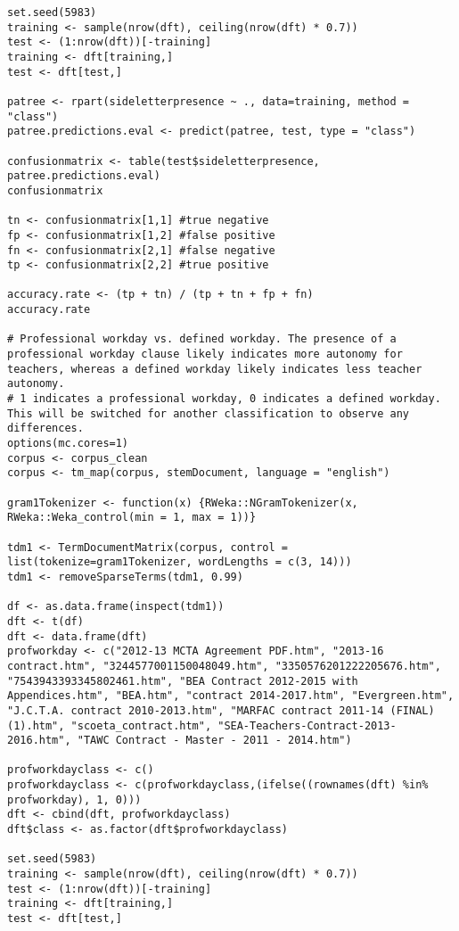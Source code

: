 \begin{lstlisting}
set.seed(5983)
training <- sample(nrow(dft), ceiling(nrow(dft) * 0.7))
test <- (1:nrow(dft))[-training]
training <- dft[training,]
test <- dft[test,]

patree <- rpart(sideletterpresence ~ ., data=training, method = "class")
patree.predictions.eval <- predict(patree, test, type = "class")

confusionmatrix <- table(test$sideletterpresence, patree.predictions.eval)
confusionmatrix

tn <- confusionmatrix[1,1] #true negative
fp <- confusionmatrix[1,2] #false positive
fn <- confusionmatrix[2,1] #false negative
tp <- confusionmatrix[2,2] #true positive

accuracy.rate <- (tp + tn) / (tp + tn + fp + fn)
accuracy.rate

# Professional workday vs. defined workday. The presence of a professional workday clause likely indicates more autonomy for teachers, whereas a defined workday likely indicates less teacher autonomy. 
# 1 indicates a professional workday, 0 indicates a defined workday. This will be switched for another classification to observe any differences.
options(mc.cores=1)
corpus <- corpus_clean
corpus <- tm_map(corpus, stemDocument, language = "english")

gram1Tokenizer <- function(x) {RWeka::NGramTokenizer(x, RWeka::Weka_control(min = 1, max = 1))}

tdm1 <- TermDocumentMatrix(corpus, control = list(tokenize=gram1Tokenizer, wordLengths = c(3, 14)))
tdm1 <- removeSparseTerms(tdm1, 0.99)

df <- as.data.frame(inspect(tdm1))
dft <- t(df)
dft <- data.frame(dft)
profworkday <- c("2012-13 MCTA Agreement PDF.htm", "2013-16 contract.htm", "3244577001150048049.htm", "3350576201222205676.htm", "7543943393345802461.htm", "BEA Contract 2012-2015 with Appendices.htm", "BEA.htm", "contract 2014-2017.htm", "Evergreen.htm", "J.C.T.A. contract 2010-2013.htm", "MARFAC contract 2011-14 (FINAL) (1).htm", "scoeta_contract.htm", "SEA-Teachers-Contract-2013-2016.htm", "TAWC Contract - Master - 2011 - 2014.htm")

profworkdayclass <- c()
profworkdayclass <- c(profworkdayclass,(ifelse((rownames(dft) %in% profworkday), 1, 0)))
dft <- cbind(dft, profworkdayclass)
dft$class <- as.factor(dft$profworkdayclass)

set.seed(5983)
training <- sample(nrow(dft), ceiling(nrow(dft) * 0.7))
test <- (1:nrow(dft))[-training]
training <- dft[training,]
test <- dft[test,]


\end{lstlisting}
